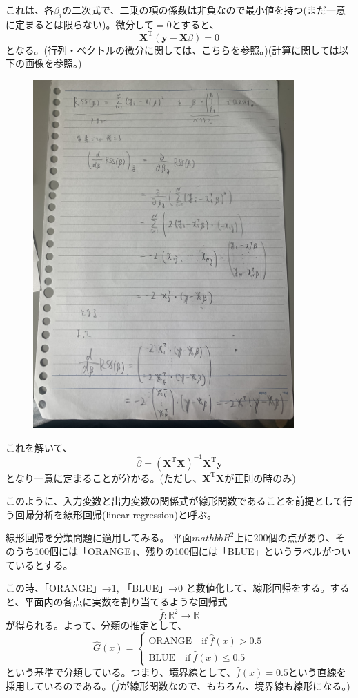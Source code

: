\documentclass[uplatex]{jsarticle}
\begin{document}
これは、各$\beta_i$の二次式で、二乗の項の係数は非負なので最小値を持つ(まだ一意に定まるとは限らない)。微分して$=0$とすると、
\[
  \mathbf{X}^\mathrm{T}(\mathbf{y}-\mathbf{X}\beta)=0
\]
となる。(\href{https://qiita.com/AnchorBlues/items/8fe2483a3a72676eb96d}{行列・ベクトルの微分に関しては、こちらを参照。})(計算に関しては以下の画像を参照。)
\begin{figure}[htb]
  \includegraphics[width=100mm, angle=270]{./images/fig-cal-2.jpg}
\end{figure}


これを解いて、
\[
  \hat{\beta}=(\mathbf{X}^\mathrm{T}\mathbf{X})^{-1}\mathbf{X}^\mathrm{T}\mathbf{y}
\]
となり一意に定まることが分かる。(ただし、$\mathbf{X}^\mathrm{T}\mathbf{X}$が正則の時のみ)

このように、入力変数と出力変数の関係式が線形関数であることを前提として行う回帰分析を線形回帰(linear regression)と呼ぶ。

線形回帰を分類問題に適用してみる。
平面$mathbb{R}^2$上に200個の点があり、そのうち100個には「ORANGE」、残りの100個には「BLUE」というラベルがついているとする。

この時、「ORANGE」→1, 「BLUE」→0 と数値化して、線形回帰をする。すると、平面内の各点に実数を割り当てるような回帰式
\[
  \hat{f} \colon \mathbb{R}^2 \to \mathbb{R}
\]
が得られる。よって、分類の推定として、
\[
  \hat{G}(x) =
  \begin{cases}
    \mbox{ORANGE} \quad \mathrm{if} \ \hat{f}(x) > 0.5 \\
    \mbox{BLUE}  \quad \mathrm{if} \ \hat{f}(x) \le 0.5
  \end{cases}
\]
という基準で分類している。つまり、境界線として、$\hat{f}(x)=0.5$という直線を採用しているのである。($\hat{f}$が線形関数なので、もちろん、境界線も線形になる。)
\end{document}
